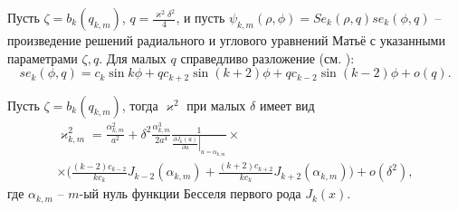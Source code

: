 Пусть $\zeta = b_k(q_{k,m})$, $q=\frac{\varkappa^2 \delta^2}{4}$, и пусть 
$\psi_{k,m}(\rho, \phi) = Se_k(\rho, q)se_k(\phi, q)$ -- произведение решений радиального и углового уравнений Матьё с указанными параметрами $\zeta, q$. Для малых $q$ справедливо разложение (см. \cite[\S~2.2, с.~122---124]{wref12}):
$$se_k(\phi, q) = c_k \sin{k \phi} + q c_{k+2} \sin{(k+2) \phi} +q c_{k-2} \sin{(k-2) \phi} + o(q).$$ 
\begin{lemma}
Пусть $\zeta = b_k(q_{k, m})$, тогда $\varkappa^2$ при малых $\delta$ имеет вид
\begin{multline*}
\varkappa_{k, m}^2 = 
\frac{\alpha_{k, m}^2}{a^2} +  \delta^2 \frac{\alpha_{k, m}^3}{2 a^4}\frac{1}{\left.\frac{\partial J_{k} (u)}{\partial u}\right|_{u=\alpha_{k, m}}} \times \\ \times
\biggl(
\frac{(k-2)c_{k-2}}{k c_k} J_{k-2}(\alpha_{k, m}) + \frac{(k+2)c_{k+2} }{k c_k} J_{k+2}(\alpha_{k, m})
\biggr) + o(\delta^2),
\end{multline*}
где $\alpha_{k, m}$ -- $m$-ый нуль функции Бесселя первого рода $J_{k}(x)$.
\label{th:lemEllipse2}
\end{lemma}
